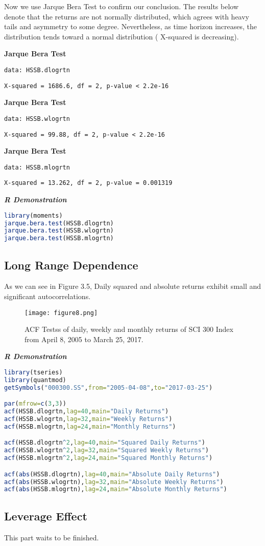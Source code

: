 \documentclass[paper=a4, fontsize=11pt]{scrartcl} %
\numberwithin{equation}{section} %
\numberwithin{figure}{section} %
\numberwithin{table}{section} %
\begin{document}
\bigskip
\bigskip

Now we use Jarque Bera Test to confirm our conclusion. The results below denote that the returns are not normally distributed, which agrees with heavy tails and asymmetry to some degree. Nevertheless, as time horizon increases, the distribution tends toward a normal distribution ( X-squared is decreasing).

\bigskip
\textbf{Jarque Bera Test}\par
\texttt{data:  HSSB.dlogrtn}\par
\texttt{X-squared = 1686.6, df = 2, p-value < 2.2e-16}\par

\textbf{Jarque Bera Test}\par
\texttt{data:  HSSB.wlogrtn}\par
\texttt{X-squared = 99.88, df = 2, p-value < 2.2e-16}\par

\textbf{Jarque Bera Test}\par
\texttt{data:  HSSB.mlogrtn}\par
\texttt{X-squared = 13.262, df = 2, p-value = 0.001319}\par

\bigskip
\textbf{\textit{R Demonstration}}
\begin{lstlisting}[language=R]
library(moments)
jarque.bera.test(HSSB.dlogrtn)
jarque.bera.test(HSSB.wlogrtn)
jarque.bera.test(HSSB.mlogrtn)
\end{lstlisting}
\newpage

\subsection{Long Range Dependence}
As we can see in Figure 3.5, Daily squared and absolute returns exhibit small and significant autocorrelations.
\begin{figure}[H]
  \centering
  \texttt{[image: figure8.png]}\\
  \caption{ACF Testss of daily, weekly and monthly returns of SCI 300 Index from April 8, 2005 to March 25, 2017.}
\end{figure}

\bigskip
\textbf{\textit{R Demonstration}}
\begin{lstlisting}[language=R]
library(tseries)
library(quantmod)
getSymbols("000300.SS",from="2005-04-08",to="2017-03-25")

par(mfrow=c(3,3))
acf(HSSB.dlogrtn,lag=40,main="Daily Returns")
acf(HSSB.wlogrtn,lag=32,main="Weekly Returns")
acf(HSSB.mlogrtn,lag=24,main="Monthly Returns")

acf(HSSB.dlogrtn^2,lag=40,main="Squared Daily Returns")
acf(HSSB.wlogrtn^2,lag=32,main="Squared Weekly Returns")
acf(HSSB.mlogrtn^2,lag=24,main="Squared Monthly Returns")

acf(abs(HSSB.dlogrtn),lag=40,main="Absolute Daily Returns")
acf(abs(HSSB.wlogrtn),lag=32,main="Absolute Weekly Returns")
acf(abs(HSSB.mlogrtn),lag=24,main="Absolute Monthly Returns")
\end{lstlisting}

\bigskip
\bigskip

\subsection{Leverage Effect}
This part waits to be finished.

\end{document}
